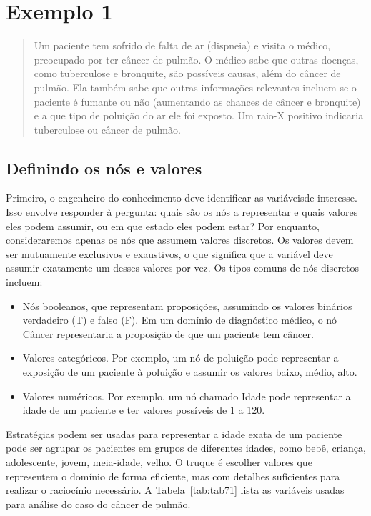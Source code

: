 \section{Exemplo 1}

\begin{quotation}
Um paciente tem sofrido de falta de ar (dispneia) e visita o médico, preocupado por ter câncer de pulmão. O médico sabe que outras doenças, como tuberculose e bronquite, são possíveis causas, além do câncer de pulmão. Ela também sabe que outras informações relevantes incluem se o paciente é fumante ou não (aumentando as chances de câncer e bronquite) e a que tipo de poluição do ar ele foi exposto. Um raio-X positivo indicaria tuberculose ou câncer de pulmão.
\end{quotation}

\subsection{Definindo os nós e valores}

Primeiro, o engenheiro do conhecimento deve identificar as variáveis ​​de interesse. Isso envolve responder à pergunta: quais são os nós a representar e quais valores eles podem assumir, ou em que estado eles podem estar? Por enquanto, consideraremos apenas os nós que assumem valores discretos. Os valores devem ser mutuamente exclusivos e exaustivos, o que significa que a variável deve assumir exatamente um desses valores por vez. Os tipos comuns de nós discretos incluem:

\begin{itemize}
\item Nós booleanos, que representam proposições, assumindo os valores binários verdadeiro (T) e falso (F). Em um domínio de diagnóstico médico, o nó Câncer representaria a proposição de que um paciente tem câncer.
\item Valores categóricos. Por exemplo, um nó de poluição pode representar a exposição de um paciente à poluição e assumir os valores {baixo, médio, alto}.
\item Valores numéricos. Por exemplo, um nó chamado Idade pode representar a idade de um paciente e ter valores possíveis de 1 a 120.
\end{itemize}

Estratégias podem ser usadas para representar a idade exata de um paciente pode ser agrupar os pacientes em grupos de diferentes idades, como {bebê, criança, adolescente, jovem, meia-idade, velho}. O truque é escolher valores que representem o domínio de forma eficiente, mas com detalhes suficientes para realizar o raciocínio necessário. A Tabela~\ref{tab:tab71} lista as variáveis usadas para análise do caso do câncer de pulmão. 

